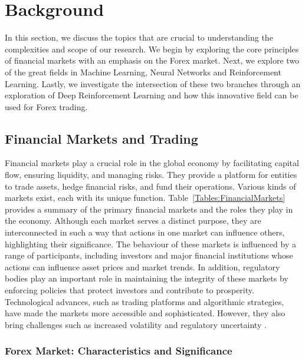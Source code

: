 \section{Background}

In this section, we discuss the topics that are crucial to understanding the complexities and scope of our research. We begin by exploring the core principles of financial markets with an emphasis on the Forex market. Next, we explore two of the great fields in Machine Learning, Neural Networks and Reinforcement Learning. Lastly, we investigate the intersection of these two branches through an exploration of Deep Reinforcement Learning and how this innovative field can be used for Forex trading.

\subsection{Financial Markets and Trading}

Financial markets play a crucial role in the global economy by facilitating capital flow, ensuring liquidity, and managing risks. They provide a platform for entities to trade assets, hedge financial risks, and fund their operations. Various kinds of markets exist, each with its unique function. Table~\ref{Tables:FinancialMarkets} provides a summary of the primary financial markets and the roles they play in the economy. Although each market serves a distinct purpose, they are interconnected in such a way that actions in one market can influence others, highlighting their significance. The behaviour of these markets is influenced by a range of participants, including investors and major financial institutions whose actions can influence asset prices and market trends. In addition, regulatory bodies play an important role in maintaining the integrity of these markets by enforcing policies that protect investors and contribute to prosperity. Technological advances, such as trading platforms and algorithmic strategies, have made the markets more accessible and sophisticated. However, they also bring challenges such as increased volatility and regulatory uncertainty \cite{brandimarte_introduction_2018}.



\subsubsection{Forex Market: Characteristics and Significance}

